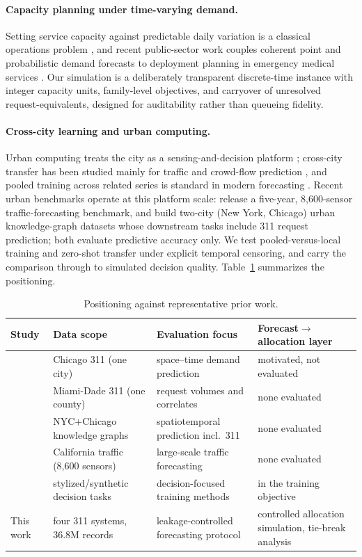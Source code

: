 \paragraph{Capacity planning under time-varying demand.}
Setting service capacity against predictable daily variation is a
classical operations problem \citep{green2007coping}, and recent
public-sector work couples coherent point and probabilistic demand
forecasts to deployment planning in emergency medical services
\citep{rostamitabar2025hierarchical}. Our simulation is a
deliberately transparent discrete-time instance with integer capacity
units, family-level objectives, and carryover of unresolved
request-equivalents, designed for auditability rather than queueing
fidelity.

\paragraph{Cross-city learning and urban computing.}
Urban computing treats the city as a sensing-and-decision platform
\citep{zheng2014urban}; cross-city transfer has been studied mainly for
traffic and crowd-flow prediction \citep{wang2019crosscity}, and pooled
training across related series is standard in modern forecasting
\citep{salinas2020deepar}. Recent urban benchmarks operate at this
platform scale: \citet{liu2023largest} release a five-year,
8{,}600-sensor traffic-forecasting benchmark, and \citet{ning2023uukg}
build two-city (New York, Chicago) urban knowledge-graph datasets whose
downstream tasks include 311 request prediction; both evaluate
predictive accuracy only. We test pooled-versus-local training and
zero-shot transfer under explicit temporal censoring, and carry the
comparison through to simulated decision quality.
Table~\ref{tab:positioning} summarizes the positioning.

\begin{table}[t]\centering\scriptsize
\caption{Positioning against representative prior work.}
\label{tab:positioning}
\begin{tabular}{@{}l l l l@{}}
\toprule
Study & Data scope & Evaluation focus & Forecast$\to$allocation layer \\
\midrule
\citet{xu2017predicting} & Chicago 311 (one city) & space--time demand prediction & motivated, not evaluated \\
\citet{cheng2022machine} & Miami-Dade 311 (one county) & request volumes and correlates & none evaluated \\
\citet{ning2023uukg} & NYC{+}Chicago knowledge graphs & spatiotemporal prediction incl.\ 311 & none evaluated \\
\citet{liu2023largest} & California traffic (8{,}600 sensors) & large-scale traffic forecasting & none evaluated \\
\citet{mandi2024decision} & stylized/synthetic decision tasks & decision-focused training methods & in the training objective \\
This work & four 311 systems, 36.8M records & leakage-controlled forecasting protocol & controlled allocation simulation, tie-break analysis \\
\bottomrule
\end{tabular}
\end{table}
